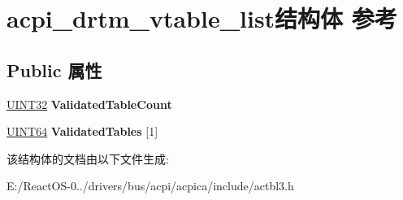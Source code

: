 \hypertarget{structacpi__drtm__vtable__list}{}\section{acpi\+\_\+drtm\+\_\+vtable\+\_\+list结构体 参考}
\label{structacpi__drtm__vtable__list}
\subsection*{Public 属性}
\begin{DoxyCompactItemize}
\item 
\mbox{\label{structacpi__drtm__vtable__list_a2c9a23909713680e8941300590043641}} 
\hyperlink{_processor_bind_8h_ae1e6edbbc26d6fbc71a90190d0266018}{U\+I\+N\+T32} {\bfseries Validated\+Table\+Count}
\item 
\mbox{\label{structacpi__drtm__vtable__list_acac9afde2d2de3d5489a582022b52f37}} 
\hyperlink{_processor_bind_8h_a57be03562867144161c1bfee95ca8f7c}{U\+I\+N\+T64} {\bfseries Validated\+Tables} \mbox{[}1\mbox{]}
\end{DoxyCompactItemize}


该结构体的文档由以下文件生成\+:\begin{DoxyCompactItemize}
\item 
E\+:/\+React\+O\+S-\/0../drivers/bus/acpi/acpica/include/actbl3.\+h\end{DoxyCompactItemize}
